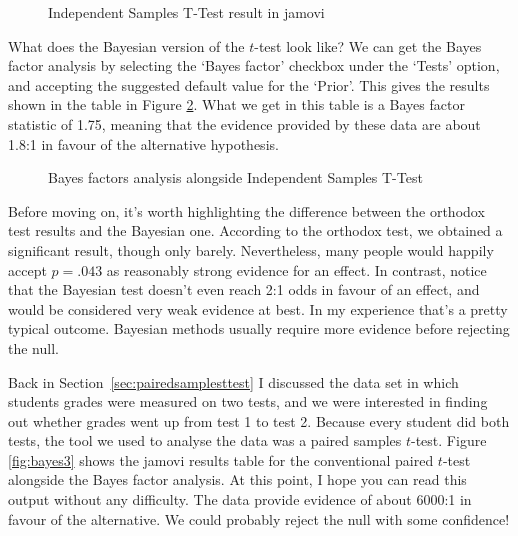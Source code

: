 \begin{figure}[h!!]
\begin{center}
\caption{Independent Samples T-Test result in jamovi}
\label{fig:bayes1}
\HR
\end{center}
\end{figure}

What does the Bayesian version of the $t$-test look like? We can get the Bayes factor analysis by selecting the `Bayes factor' checkbox under the `Tests' option, and accepting the suggested default value for the `Prior'. This gives the results shown in the table in Figure \ref{fig:bayes2}. What we get in this table is a Bayes factor statistic of 1.75, meaning that the evidence provided by these data are about 1.8:1 in favour of the alternative hypothesis. 

\begin{figure}[h!!]
\begin{center}
\caption{Bayes factors analysis alongside Independent Samples T-Test}
\label{fig:bayes2}
\HR
\end{center}
\end{figure}


Before moving on, it's worth highlighting the difference between the orthodox test results and the Bayesian one. According to the orthodox test, we obtained a significant result, though only barely. Nevertheless, many people would happily accept $p=.043$ as reasonably strong evidence for an effect. In contrast, notice that the Bayesian test doesn't even reach 2:1 odds in favour of an effect, and would be considered very weak evidence at best. In my experience that's a pretty typical outcome. Bayesian methods usually require more evidence before rejecting the null.


Back in Section~\ref{sec:pairedsamplesttest} I discussed the  data set in which students grades were measured on two tests, and we were interested in finding out whether grades went up from test 1 to test 2. Because every student did both tests, the tool we used to analyse the data was a paired samples $t$-test. Figure \ref{fig:bayes3} shows the jamovi results table for the conventional paired $t$-test alongside the Bayes factor analysis. At this point, I hope you can read this output without any difficulty. The data provide evidence of about 6000:1 in favour of the alternative. We could probably reject the null with some confidence!


